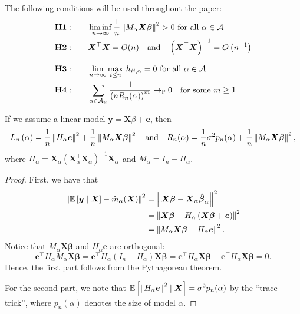\documentclass[12pt, letter paper]{article}
\newcommand{\1}{\mathmybb{1}}
\newcommand{\0}{\emptyset}
\newcommand{\prob}{\mathbb{P}}
\newcommand{\Ep}[1]{\mathbb{E}\left[ #1 \right]}
\newcommand{\paren}[1]{\left(#1 \right)}
\newcommand{\norm}[1]{\left|\hspace{-1pt}\left|#1 \right|\hspace{-1pt}\right|}
\newcommand{\normsq}[1]{\norm{#1}^{2}}
\newcommand{\Acal}{\mathcal{A}}
\newcommand{\X}{\boldsymbol{X}}
\newcommand{\y}{\boldsymbol{y}}
\newcommand{\e}{\boldsymbol{e}}
\newcommand{\bbeta}{\boldsymbol{\beta}}
\newcommand{\bbetahat}{\boldsymbol{\hat{\beta}}}
\newcommand{\Loss}[1]{L_{n}\paren{#1}}
\begin{document}
\begin{tcolorbox}[title=Assumptions, fonttitle=\bfseries]
    The following conditions will be used throughout the paper:
    \begin{align*}
        &\mathbf{H1:}\qquad \liminf_{n\to\infty} \frac{1}{n}\normsq{M_{\alpha}\X\bbeta}>0 \text{ for all }\alpha \in\Acal\\
        &\mathbf{H2:} \qquad \X^{\top}\X = O(n)\quad\text{and}\quad\paren{\X^{\top}\X}^{-1}= O\paren{n^{-1}}\\[2.5mm]
        &\mathbf{H3:}\qquad \lim_{n\to\infty}\max_{i\leq n}\,h_{ii,\alpha} = 0 \text{ for all }\alpha \in\Acal\\
        &\mathbf{H4:}\qquad \sum_{\alpha\in\Acal_{w}}\frac{1}{\paren{nR_{n}(\alpha)}^{m}}\to_{\prob}0\quad\text{for some }m\geq 1
    \end{align*}
\end{tcolorbox}

\begin{proposition}{}
    If we assume a linear model \(\y = \X\beta + \e\), then
    \[\Loss{\alpha} = \frac{1}{n}\normsq{H_{\alpha}\e} + \frac{1}{n}\normsq{M_{\alpha}\X\bbeta}\quad\text{and}\quad R_{n}(\alpha) = \frac{1}{n}\sigma^{2}p_{n}(\alpha) + \frac{1}{n}\normsq{M_{\alpha}\X\bbeta},\]
    where \(H_{\alpha} = \X_{\alpha}\paren{\X_{\alpha}^{\top}\X_{\alpha}}^{-1}\X_{\alpha}^{\top}\) and \(M_{\alpha}= I_{n} - H_{\alpha}\).
\end{proposition}
\begin{proof}
    First, we have that
    \begin{align*}
        \normsq{\Ep{\y\mid\X} - \hat{m}_{\alpha}(\X)} &= \normsq{\X\bbeta - \X_{\alpha}\bbetahat_{\alpha}}\\
        &= \normsq{\X\bbeta - H_{\alpha}\paren{\X\bbeta + \e}}\\
        &= \normsq{M_{\alpha}\X\bbeta - H_{\alpha}\e}.
    \end{align*}
    Notice that \(M_{\alpha}\X\bbeta\) and \(H_{\alpha}\e\) are orthogonal:
    \[\e^{\top}H_{\alpha}M_{\alpha}\X\bbeta  = \e^{\top}H_{\alpha}\paren{I_{n} - H_{\alpha}}\X\bbeta = \e^{\top}H_{\alpha}\X\bbeta - \e^{\top}H_{\alpha}\X\bbeta = 0.\]
    Hence, the first part follows from the Pythagorean theorem.

    For the second part, we note that \(\Ep{\normsq{H_{\alpha}\e}\mid\X} = \sigma^{2}p_{n}(\alpha)\) by the ``trace trick'', where \(p_{n}(\alpha)\) denotes the size of model \(\alpha\).
\end{proof}
\end{document}
